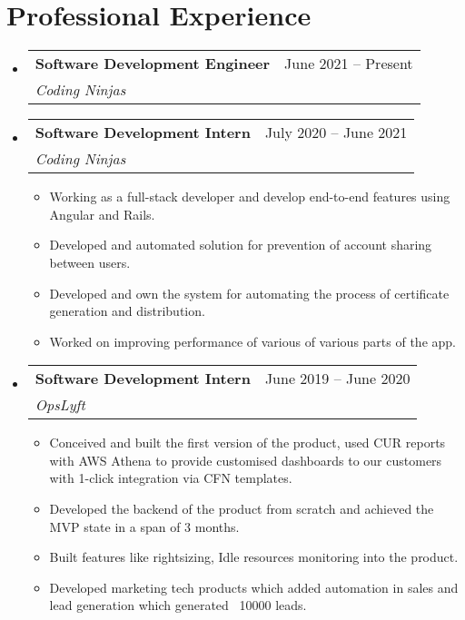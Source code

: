 \documentclass[letterpaper,11pt]{article}
\makeatletter
\newcommand{\resumeItem}[1]{
  \item\small{
    {#1 \vspace{-2pt}}
  }
}
\newcommand{\resumeSubheading}[4]{
  \vspace{-2pt}\item
    \begin{tabular*}{0.97\textwidth}[t]{l@{\extracolsep{\fill}}r}
      \textbf{#1} & #2 \\
      \textit{\small#3} & \textit{\small #4} \\
    \end{tabular*}\vspace{-7pt}
}
\newcommand{\resumeSubSubheading}[2]{
    \item
    \begin{tabular*}{0.97\textwidth}{l@{\extracolsep{\fill}}r}
      \textit{\small#1} & \textit{\small #2} \\
    \end{tabular*}\vspace{-7pt}
}
\newcommand{\resumeSubHeadingListStart}{\begin{itemize}[leftmargin=0.15in, label={}]}
\newcommand{\resumeSubHeadingListEnd}{\end{itemize}}
\newcommand{\resumeItemListStart}{\begin{itemize}}
\newcommand{\resumeItemListEnd}{\end{itemize}\vspace{-5pt}}
\makeatother
\begin{document}
\section{Professional Experience}
  \resumeSubHeadingListStart

  \resumeSubheading
    {Software Development Engineer}{June 2021 -- Present}
    {Coding Ninjas}{}
  \resumeSubheading
      {Software Development Intern}{July 2020 -- June 2021}
      {Coding Ninjas}{}
      \resumeItemListStart
        \resumeItem{Working as a full-stack developer and develop end-to-end features using Angular and Rails.}
        \resumeItem{Developed and automated solution for prevention of account sharing between users.}
        \resumeItem{Developed and own the system for automating the process of certificate generation and distribution.}
        \resumeItem{Worked on improving performance of various of various parts of the app.}
      \resumeItemListEnd
      

    \resumeSubheading
      {Software Development Intern}{June 2019 -- June 2020}
      {OpsLyft}{}
      \resumeItemListStart
        \resumeItem{Conceived and built the first version of the product, used CUR reports with AWS Athena to provide customised dashboards to our customers with 1-click integration via CFN templates.}
        \resumeItem{Developed the backend of the product from scratch and achieved the MVP state in a span of 3 months.}
        \resumeItem{Built features like rightsizing, Idle resources monitoring into the product.}
        \resumeItem{Developed marketing tech products which added automation in sales and lead generation which generated ~10000 leads.}
    \resumeItemListEnd
  \resumeSubHeadingListEnd


\end{document}
